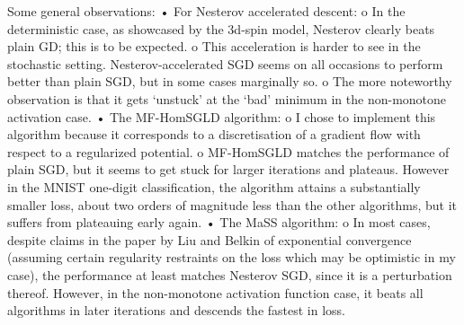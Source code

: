 \documentclass{article}
\begin{document}
Some general observations: 
•	For Nesterov accelerated descent:
o	In the deterministic case, as showcased by the 3d-spin model, Nesterov clearly beats plain GD;  this is to be expected.
o	This acceleration is harder to see in the stochastic setting. Nesterov-accelerated SGD seems on all occasions to perform better than plain SGD, but in some cases marginally so.
o	The more noteworthy observation is that it gets ‘unstuck’ at the ‘bad’ minimum in the non-monotone activation case.
•	The MF-HomSGLD algorithm:
o	I chose to implement this algorithm because it corresponds to a discretisation of a gradient flow with respect to a regularized potential.
o	MF-HomSGLD matches the performance of plain SGD, but it seems to get stuck for larger iterations and plateaus. However in the MNIST one-digit classification, the algorithm attains a substantially smaller loss, about two orders of magnitude less than the other algorithms, but it suffers from plateauing early again.
•	The MaSS algorithm: 
o	In most cases, despite claims in the paper by Liu and Belkin of exponential convergence (assuming certain regularity restraints on the loss which may be optimistic in my case), the performance at least matches Nesterov SGD, since it is a perturbation thereof. However, in the non-monotone activation function case, it beats all algorithms in later iterations and descends the fastest in loss.



\newpage


\end{document}
